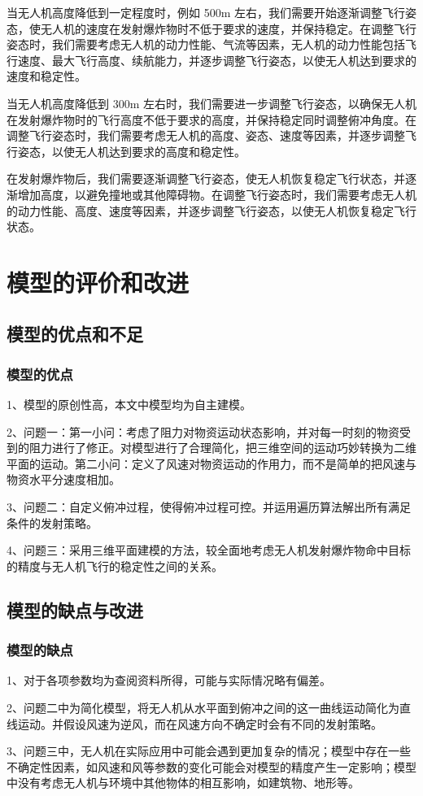 \documentclass[normalsize]{ctexart}
\begin{document}
 当无人机高度降低到一定程度时，例如 500m 左右，我们需要开始逐渐调整飞行姿态，使无人机的速度在发射爆炸物时不低于要求的速度，并保持稳定。在调整飞行姿态时，我们需要考虑无人机的动力性能、气流等因素，无人机的动力性能包括飞行速度、最大飞行高度、续航能力，并逐步调整飞行姿态，以使无人机达到要求的速度和稳定性。
 
 当无人机高度降低到 300m 左右时，我们需要进一步调整飞行姿态，以确保无人机在发射爆炸物时的飞行高度不低于要求的高度，并保持稳定同时调整俯冲角度。在调整飞行姿态时，我们需要考虑无人机的高度、姿态、速度等因素，并逐步调整飞行姿态，以使无人机达到要求的高度和稳定性。
 
 在发射爆炸物后，我们需要逐渐调整飞行姿态，使无人机恢复稳定飞行状态，并逐渐增加高度，以避免撞地或其他障碍物。在调整飞行姿态时，我们需要考虑无人机的动力性能、高度、速度等因素，并逐步调整飞行姿态，以使无人机恢复稳定飞行状态。
 
\newpage

		\section{模型的评价和改进}
		
		\subsection{模型的优点和不足}	
		
		\subsubsection{模型的优点}
		1、模型的原创性高，本文中模型均为自主建模。
		\par 2、问题一：第一小问：考虑了阻力对物资运动状态影响，并对每一时刻的物资受到的阻力进行了修正。对模型进行了合理简化，把三维空间的运动巧妙转换为二维平面的运动。第二小问：定义了风速对物资运动的作用力，而不是简单的把风速与物资水平分速度相加。
		\par 3、问题二：自定义俯冲过程，使得俯冲过程可控。并运用遍历算法解出所有满足条件的发射策略。
		\par 4、问题三：采用三维平面建模的方法，较全面地考虑无人机发射爆炸物命中目标的精度与无人机飞行的稳定性之间的关系。
		\subsection{模型的缺点与改进}	
		\subsubsection{模型的缺点}
		1、对于各项参数均为查阅资料所得，可能与实际情况略有偏差。
		\par 2、问题二中为简化模型，将无人机从水平面到俯冲之间的这一曲线运动简化为直线运动。并假设风速为逆风，而在风速方向不确定时会有不同的发射策略。
		\par 3、问题三中，无人机在实际应用中可能会遇到更加复杂的情况；模型中存在一些不确定性因素，如风速和风等参数的变化可能会对模型的精度产生一定影响；模型中没有考虑无人机与环境中其他物体的相互影响，如建筑物、地形等。
\end{document}
